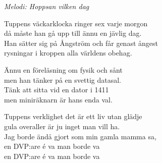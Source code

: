 {\footnotesize\textit{Melodi: Hoppsan vilken dag}}\par
\vspace{10pt}
Tuppens väckarklocka ringer sex varje morgon\\
då måste han gå upp till ännu en jävlig dag.\\
Han sätter sig på Ångström och får genast ångest\\
rysningar i kroppen alla världens obehag.\par
\vspace{10pt}
Ännu en föreläsning om fysik och sånt\\
men han tänker på en svettig datasal.\\
Tänk att sitta vid en dator i 1411\\
men miniräknarn är hans enda val.\par
\vspace{10pt}
Tuppens verklighet det är ett liv utan glädje\\
gula overaller är ju inget man vill ha.\\
Jag borde ändå gjort som min gamla mamma sa,\\
en DVP:are é va man borde va\\
\revrpt en DVP:are é va man borde va\rpt
